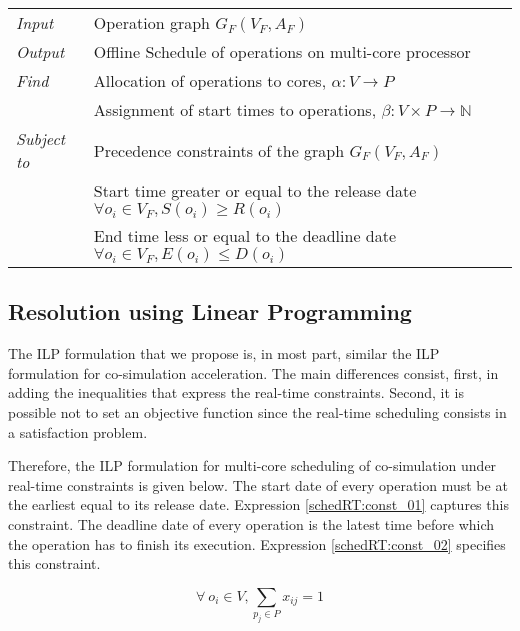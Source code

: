 \begin{table}[h]
\centering
\begin{tabular}{l  l}
  \rule{0pt}{5ex}	
	\textit{Input} & Operation graph $G_F(V_F,A_F)$\\
	\rule{0pt}{5ex}									  
	
  \textit{Output} & Offline Schedule of operations on multi-core processor\\
	\rule{0pt}{5ex}									  
  
	\textit{Find} & Allocation of operations to cores, $\alpha: V \rightarrow P$\\
	\rule{0pt}{5ex}
                & Assignment of start times to operations, $\beta: V \times P \rightarrow \mathbb{N}$\\
	\rule{0pt}{5ex}								 
	
	\textit{Subject to} & Precedence constraints of the graph $G_F(V_F,A_F)$\\
											& Start time greater or equal to the release date $\forall o_i \in V_F, S(o_i) \geq R(o_i)$\\
											& End time less or equal to the deadline date $\forall o_i \in V_F, E(o_i) \leq D(o_i)$\\
										 
	
\end{tabular}
\end{table}

\subsection{Resolution using Linear Programming}

The ILP formulation that we propose is, in most part, similar the ILP formulation for co-simulation acceleration. The main differences consist, first, in adding the inequalities that express the real-time constraints. Second, it is possible not to set an objective function since the real-time scheduling consists in a satisfaction problem.

Therefore, the ILP formulation for multi-core scheduling of co-simulation under real-time constraints is given below. The start date of every operation must be at the earliest equal to its release date. Expression \ref{schedRT:const_01} captures this constraint. The deadline date of every operation is the latest time before which the operation has to finish its execution. Expression \ref{schedRT:const_02} specifies this constraint.

\begin{equation}
\forall\ o_i \in V, \sum_{p_j \in P}x_{ij}=1
\label{schedRT:const_1}
\end{equation}

